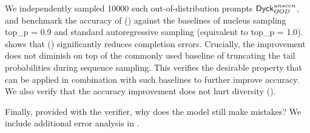 We independently sampled 10000 such out-of-distribution prompts $\mathsf{Dyck}_{OOD}^{unseen}$,
and benchmark the accuracy of \algoName ()
against the baselines of 
nucleus sampling top\_p = 0.9 \citep{holtzman2020the}
and standard autoregressive sampling (equivalent to top\_p = 1.0).
shows that 
\algoName () significantly reduces completion errors.
Crucially, the improvement does not diminish on top of the commonly used baseline of truncating the tail probabilities during sequence sampling.
This verifies the desirable property that 
\algoName 
can be applied in combination with such baselines to further improve accuracy.
We also verify that the accuracy improvement does not hurt diversity ().

Finally, provided with the verifier,
why does the model still make mistakes?
We include additional error analysis in .



